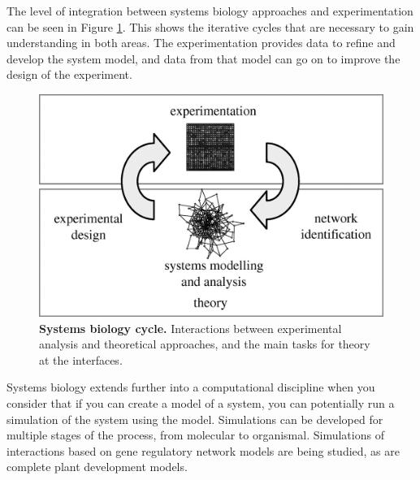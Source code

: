 The level of integration between systems biology approaches and experimentation can be seen in Figure \ref{fig:systems-biology}. This shows the iterative cycles that are necessary to gain understanding in both areas. The experimentation provides data to refine and develop the system model, and data from that model can go on to improve the design of the experiment.

\begin{figure}[tbp]
 \begin{center}
 \includegraphics[width=14cm]{./01-introduction/data/F1.png}
\end{center}
\caption[{Systems biology cycle.}]{{\bf Systems biology cycle.} Interactions between experimental analysis and theoretical approaches, and the main tasks for theory at the interfaces. \protect\citet{Doyle2006}
\label{fig:systems-biology}}
\end{figure}

Systems biology extends further into a computational discipline when you consider that if you can create a model of a system, you can potentially run a simulation of the system using the model. Simulations can be developed for multiple stages of the process, from molecular to organismal. Simulations of interactions based on gene regulatory network models are being studied\cite{Valencia2002}, as are complete plant development models\cite{Mundermann2005,Prusinkiewicz2004,Prusinkiewicz2006}.

